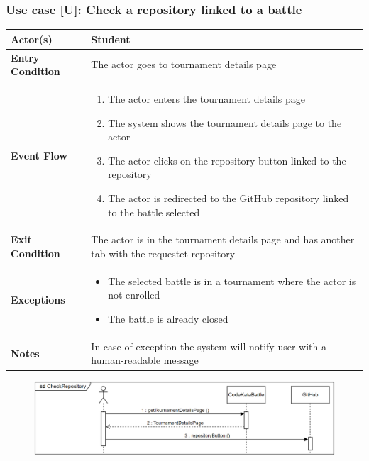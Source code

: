 \documentclass[12pt, a4paper]{report}
\newcounter{useCase}
\newcommand{\usecase}[9]{
    \def\arraystretch{1.5} 
    \subsubsection*{Use case [U#2]: #3}
    \vspace*{0.2cm}
    \begin{center}
        \begin{tabular}{|l|p{12cm}|}
            \hline
            \textbf{Actor(s)} & #4 \\
            \hline
            \textbf{Entry Condition} & #5 \\
            \hline
            \textbf{Event Flow} & #6 \\
            \hline
            \textbf{Exit Condition} & #7 \\
            \hline
            \textbf{Exceptions} & #8 \\
            \hline
            \textbf{Notes} & #9 \\
            \hline
        \end{tabular}
    \end{center}
    #1
}
\begin{document}
        \usecase{\begin{figure}[H]\centering\includegraphics[width=0.9\linewidth]{images/checkrepo.png}\end{figure}}        
        {\arabic{useCase}\stepcounter{useCase}}
        {Check a repository linked to a battle}
        {Student}
        {The actor goes to tournament details page}
        {
        \begin{enumerate}
            \item The actor enters the tournament details page
            \item The system shows the tournament details page to the actor
            \item The actor clicks on the repository button linked to the repository 
            \item The actor is redirected to the GitHub repository linked to the battle selected
        \end{enumerate}
        }
        {The actor is in the tournament details page and has another tab with the requestet repository}
        {
        \begin{itemize}
            \item The selected battle is in a tournament where the actor is not enrolled
            \item The battle is already closed
        \end{itemize}
        }
        {In case of exception the system will notify user with a human-readable message}
\end{document}
